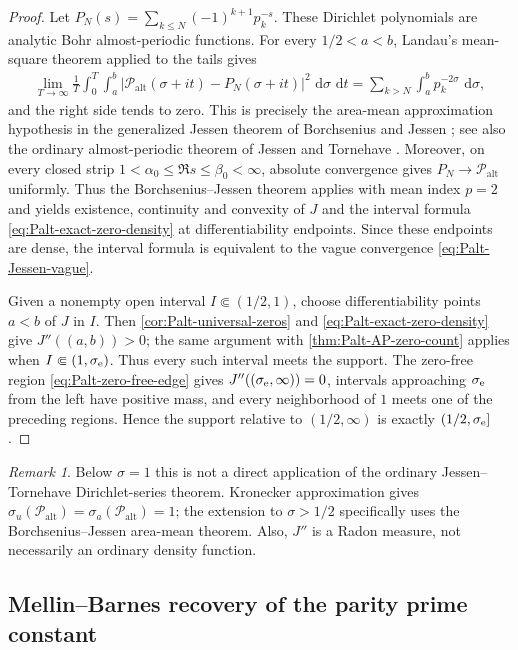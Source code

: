 \documentclass[11pt]{article}
\theoremstyle{definition}
\theoremstyle{remark}
\newtheorem{remark}[theorem]{Remark}
\newcommand{\Palt}{\mathcal P_{\mathrm{alt}}}
\newcommand{\dd}{\,\mathrm d}
\begin{document}
\begin{proof}
Let $P_N(s)=\sum_{k\le N}(-1)^{k+1}p_k^{-s}$.  These Dirichlet polynomials are
analytic Bohr almost-periodic functions.  For every $1/2<a<b$, Landau's mean-square
theorem \cite[Part~24, Satz~37]{Landau1909} applied to the tails gives
\begin{align*}
 \lim_{T\to\infty}\frac1T\int_0^T\int_a^b
 |\Palt(\sigma+it)-P_N(\sigma+it)|^2\,\dd\sigma\,\dd t
 =\sum_{k>N}\int_a^bp_k^{-2\sigma}\,\dd\sigma,
\end{align*}
and the right side tends to zero.  This is precisely the area-mean approximation
hypothesis in the generalized Jessen theorem of Borchsenius and Jessen
\cite[Theorem~1]{BorchseniusJessen1948}; see also the ordinary almost-periodic theorem
of Jessen and Tornehave \cite{JessenTornehave1945}.  Moreover, on every closed strip
$1<\alpha_0\le\Re s\le\beta_0<\infty$, absolute convergence gives
$P_N\to\Palt$ uniformly.  Thus the Borchsenius--Jessen theorem applies with mean index
$p=2$ and yields existence,
continuity and convexity of $J$ and the interval formula
\eqref{eq:Palt-exact-zero-density} at differentiability endpoints.  Since these
endpoints are dense, the interval formula is equivalent to the vague convergence
\eqref{eq:Palt-Jessen-vague}.

Given a nonempty open interval $I\Subset(1/2,1)$, choose differentiability points
$a<b$ of $J$ in $I$.  Then \cref{cor:Palt-universal-zeros} and
\eqref{eq:Palt-exact-zero-density} give $J''((a,b))>0$; the same argument with
\cref{thm:Palt-AP-zero-count} applies when $I\Subset(1,\sigma_{\rm e})$.  Thus every
such interval meets the support.  The zero-free region
\eqref{eq:Palt-zero-free-edge} gives $J''((\sigma_{\rm e},\infty))=0$, intervals
approaching $\sigma_{\rm e}$ from the left have positive mass, and every neighborhood
of $1$ meets one of the preceding regions.  Hence the support relative to
$(1/2,\infty)$ is exactly $(1/2,\sigma_{\rm e}]$.
\end{proof}

\begin{remark}
Below $\sigma=1$ this is not a direct application of the ordinary
Jessen--Tornehave Dirichlet-series theorem.  Kronecker approximation gives
$\sigma_u(\Palt)=\sigma_a(\Palt)=1$; the extension to $\sigma>1/2$ specifically
uses the Borchsenius--Jessen area-mean theorem.  Also, $J''$ is a Radon measure, not
necessarily an ordinary density function.
\end{remark}

\subsection{Mellin--Barnes recovery of the parity prime constant}
\end{document}
